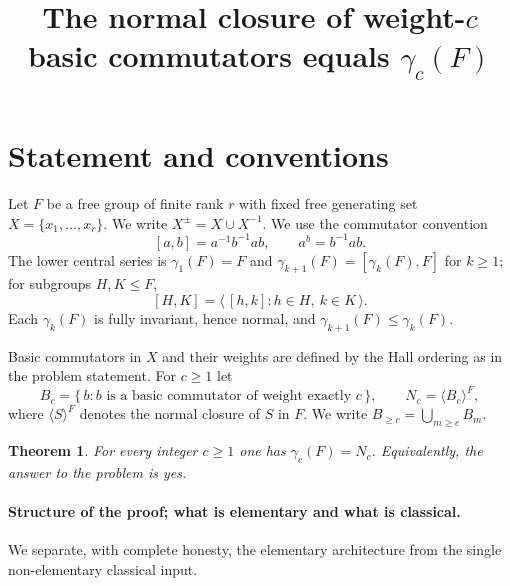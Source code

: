 \documentclass{amsart}
\newtheorem{theorem}{Theorem}
\theoremstyle{definition}
\theoremstyle{remark}
\begin{document}
\title{The normal closure of weight-$c$ basic commutators equals $\gamma_c(F)$}
\maketitle

\section{Statement and conventions}

Let $F$ be a free group of finite rank $r$ with fixed free generating set
$X=\{x_1,\dots,x_r\}$. We write $X^{\pm}=X\cup X^{-1}$. We use the commutator
convention
\[
[a,b]=a^{-1}b^{-1}ab ,\qquad a^{b}=b^{-1}ab .
\]
The lower central series is $\gamma_1(F)=F$ and $\gamma_{k+1}(F)=[\gamma_k(F),F]$
for $k\ge 1$; for subgroups $H,K\le F$,
\[
[H,K]=\big\langle\, [h,k] : h\in H,\ k\in K \,\big\rangle .
\]
Each $\gamma_k(F)$ is fully invariant, hence normal, and
$\gamma_{k+1}(F)\le\gamma_k(F)$.

Basic commutators in $X$ and their weights are defined by the Hall ordering as in
the problem statement. For $c\ge 1$ let
\[
B_c=\{\,b : b \text{ is a basic commutator of weight exactly } c\,\},
\qquad
N_c=\langle B_c\rangle^{F},
\]
where $\langle S\rangle^{F}$ denotes the normal closure of $S$ in $F$. We write
$B_{\ge c}=\bigcup_{m\ge c}B_m$.

\begin{theorem}\label{thm:main}
For every integer $c\ge 1$ one has $\gamma_c(F)=N_c$. Equivalently, the answer to
the problem is \emph{yes}.
\end{theorem}

\paragraph{Structure of the proof; what is elementary and what is classical.}
We separate, with complete honesty, the elementary architecture from the single
non-elementary classical input.
\end{document}
